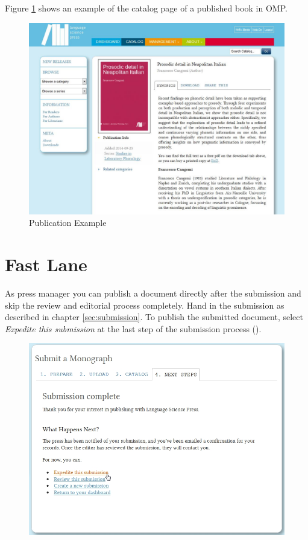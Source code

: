 Figure \ref{fig:publication} shows an example of the catalog page of a published book in OMP.
\begin{figure}[h] \centering
\includegraphics[width=1\textwidth]{./img/publication.jpg} \caption{Publication Example}
\label{fig:publication}
\end{figure}

\newpage
\section{Fast Lane}
As press manager you can publish a document directly after the submission and skip the review and editorial process completely. Hand in the submission as described in chapter \ref{sec:submission}. To publish the submitted document, select \textit{Expedite this submission} at the last step of the submission process ().

\begin{figure}[h] \centering
\includegraphics[width=1\textwidth]{./img/fastLane.jpg}
\label{fig:fastLane}
\end{figure}

